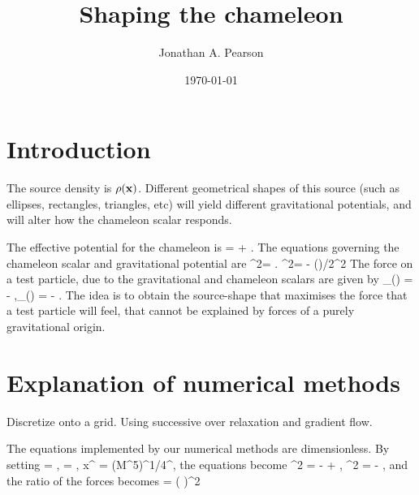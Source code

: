 \documentclass[amsmath,amssymb,10pt,eqsecnum, twocolumn]{revtex4}
\begin{document}
\title{Shaping the chameleon}
\author{Jonathan A. Pearson}
\date{\today}

\maketitle




 
 
 
\section{Introduction}

The source density is $\rho({\bf{x}})$.  Different geometrical shapes of this source (such as ellipses, rectangles, triangles, etc) will yield different gravitational potentials, and will alter how the chameleon scalar responds.

The effective potential for the chameleon is
\bea
{} =  + \phi.
\eea
The equations governing the chameleon scalar and gravitational potential are
\bse
\bea
\nabla^2\phi = .
\eea
\bea
\nabla^2\Phi = - \rho()/2^2
\eea
\ese
The force on a test particle, due to the gravitational and chameleon scalars are given by
\bea
{}_{(\phi)} = - \nabla\phi,\qquad {}_{(\Phi)} = - \nabla\Phi.
\eea
The idea is to obtain the source-shape that maximises the force that a test particle will feel, that cannot be explained by forces of a purely gravitational origin.


\section{Explanation of numerical methods}
Discretize onto a grid. Using successive over relaxation and gradient flow.

The equations   implemented by our numerical methods are dimensionless. By setting
\bse
\bea
\phi = \tilde{\phi},
\eea
\bea
\Phi = \tilde{\Phi},
\eea
\bea
x^{\mu} = \left(M\Lambda^5\right)^{1/4}^{\mu},
\eea
\ese
the equations become
\bse
\bea
\tilde{\nabla}^2\tilde{\phi} = -  + \rho,
\eea
\bea
\tilde{\nabla}^2\tilde{\Phi} = - \half \rho,
\eea
\ese
and the ratio of the  forces becomes
\bea
{} = \left( \right)^2\frac{\left| \tilde{\nabla}\tilde{\phi}\right|}{\left| \tilde{\nabla}\tilde{\Phi}\right|}
\eea
\end{document}
